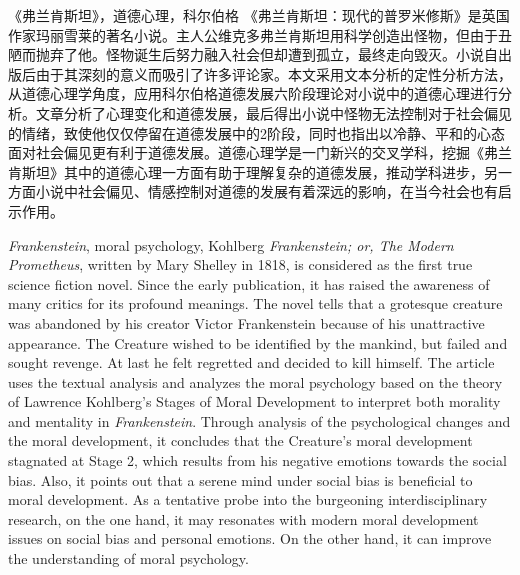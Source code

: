 
\begin{abstractzh}{《弗兰肯斯坦》，道德心理，科尔伯格}
《弗兰肯斯坦：现代的普罗米修斯》是英国作家玛丽\textperiodcentered{}雪莱的著名小说。主人公维克多\textperiodcentered{}弗兰肯斯坦用科学创造出怪物，但由于丑陋而抛弃了他。怪物诞生后努力融入社会但却遭到孤立，最终走向毁灭。小说自出版后由于其深刻的意义而吸引了许多评论家。本文采用文本分析的定性分析方法，从道德心理学角度，应用科尔伯格道德发展六阶段理论对小说中的道德心理进行分析。文章分析了心理变化和道德发展，最后得出小说中怪物无法控制对于社会偏见的情绪，致使他仅仅停留在道德发展中的2\textonehalf{}阶段，同时也指出以冷静、平和的心态面对社会偏见更有利于道德发展。道德心理学是一门新兴的交叉学科，挖掘《弗兰肯斯坦》其中的道德心理一方面有助于理解复杂的道德发展，推动学科进步，另一方面小说中社会偏见、情感控制对道德的发展有着深远的影响，在当今社会也有启示作用。

\end{abstractzh}

\begin{abstracten}{\textit{Frankenstein}, moral psychology, Kohlberg}
\textit{Frankenstein; or, The Modern Prometheus}, written by Mary Shelley in 1818, is considered as the first true science fiction novel. Since the early publication, it has raised the awareness of many critics for its profound meanings. The novel tells that a grotesque creature was abandoned by his creator Victor Frankenstein because of his unattractive appearance. The Creature wished to be identified by the mankind, but failed and sought revenge. At last he felt regretted and decided to kill himself. The article uses the textual analysis and analyzes the moral psychology based on the theory of Lawrence Kohlberg's Stages of Moral Development to interpret both morality and mentality in \textit{Frankenstein}. Through analysis of the psychological changes and the moral development, it concludes that the Creature's moral development stagnated at Stage 2\textonehalf, which results from his negative emotions towards the social bias. Also, it points out that a serene mind under social bias is beneficial to moral development. As a tentative probe into the burgeoning interdisciplinary research, on the one hand, it may resonates with modern moral development issues on social bias and personal emotions. On the other hand, it can improve the understanding of moral psychology.
\end{abstracten}
